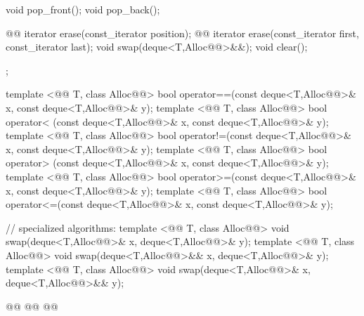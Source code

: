 \documentclass[american,twoside]{book}
\begin{document}
\begin{codeblock}
{{    void pop_front();
    void pop_back();

    @@ iterator erase(const_iterator position);
    @@ iterator erase(const_iterator first, const_iterator last);
    void     swap(deque<T,Alloc@@>&&);
    void     clear();
  };

  template <@@ T, class Alloc@@>
    bool operator==(const deque<T,Alloc@@>& x, const deque<T,Alloc@@>& y);
  template <@@ T, class Alloc@@>
    bool operator< (const deque<T,Alloc@@>& x, const deque<T,Alloc@@>& y);
  template <@@ T, class Alloc@@>
    bool operator!=(const deque<T,Alloc@@>& x, const deque<T,Alloc@@>& y);
  template <@@ T, class Alloc@@>
    bool operator> (const deque<T,Alloc@@>& x, const deque<T,Alloc@@>& y);
  template <@@ T, class Alloc@@>
    bool operator>=(const deque<T,Alloc@@>& x, const deque<T,Alloc@@>& y);
  template <@@ T, class Alloc@@>
    bool operator<=(const deque<T,Alloc@@>& x, const deque<T,Alloc@@>& y);

  // specialized algorithms:
  template <@@ T, class Alloc@@>
    void swap(deque<T,Alloc@@>& x, deque<T,Alloc@@>& y);
  template <@@ T, class Alloc@@>
    void swap(deque<T,Alloc@@>&& x, deque<T,Alloc@@>& y);
  template <@@ T, class Alloc@@>
    void swap(deque<T,Alloc@@>& x, deque<T,Alloc@@>&& y);

  @@
    @@
      @@
}
\end{codeblock}
\end{document}
